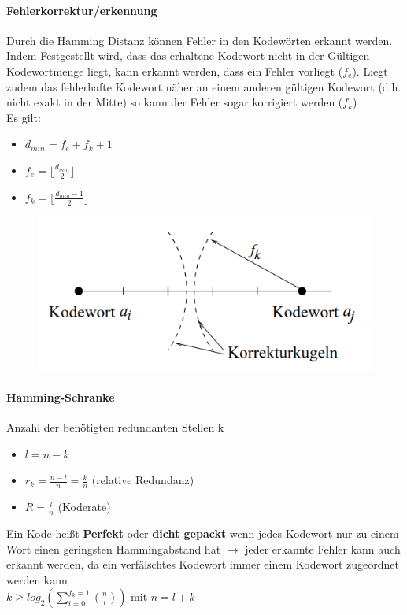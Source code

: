 \documentclass[12pt,a4paper]{article}
\begin{document}
\paragraph{Fehlerkorrektur/erkennung\\}
Durch die Hamming Distanz können Fehler in den Kodewörten erkannt werden.\\
Indem Festgestellt wird, dass das erhaltene Kodewort nicht in der Gültigen Kodewortmenge liegt, kann erkannt werden, dass ein Fehler vorliegt ($f_e$). Liegt zudem das fehlerhafte Kodewort näher an einem anderen gültigen Kodewort (d.h. nicht exakt in der Mitte) so kann der Fehler sogar korrigiert werden ($f_k$)\\
Es gilt:
\begin{itemize}
\item $d_{min} = f_e + f_k + 1$
\item $f_e = \lfloor \frac{d_{min}}{2} \rfloor$
\item $f_k = \lfloor \frac{d_{min} - 1}{2} \rfloor$
\end{itemize}
\begin{figure}[H]
\centering
\includegraphics[scale=0.7]{./resources/kor_kug.png}
\end{figure}

\paragraph{Hamming-Schranke\\}
Anzahl der benötigten redundanten Stellen k
\begin{itemize}
\item $l = n - k$
\item $r_k = \frac{n-l}{n} = \frac{k}{n}$ (relative Redundanz)
\item $R = \frac{l}{n}$ (Koderate)
\end{itemize}
Ein Kode heißt \textbf{Perfekt} oder \textbf{dicht gepackt} wenn jedes Kodewort nur zu einem Wort einen geringsten Hammingabstand hat $\rightarrow$ jeder erkannte Fehler kann auch erkannt werden, da ein verfälschtes Kodewort immer einem Kodewort zugeordnet werden kann\\
$k \geq log_2(\sum_{i=0}^{f_k = 1}\binom{n}{i})$ mit $n = l + k $
\end{document}
